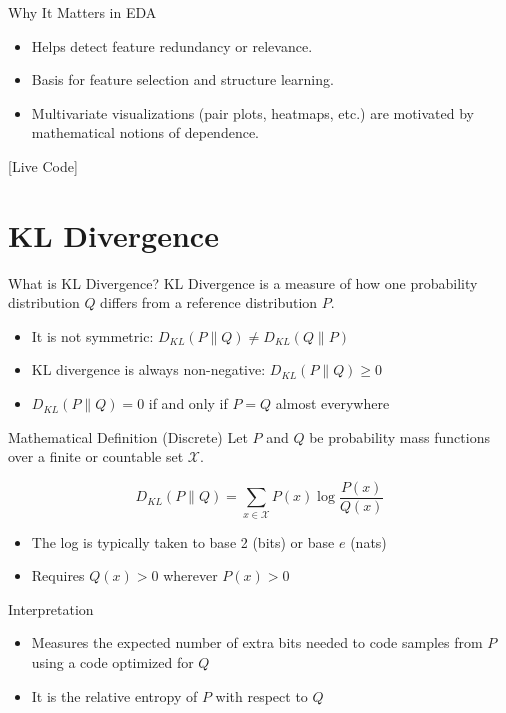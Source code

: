 \documentclass[aspectratio=169]{beamer}
\begin{document}
\begin{frame}[label={sec:org5d05c36}]{Why It Matters in EDA}
\begin{itemize}
\item Helps detect feature redundancy or relevance.
\item Basis for feature selection and structure learning.
\item Multivariate visualizations (pair plots, heatmaps, etc.) are
motivated by mathematical notions of dependence.
\end{itemize}
[Live Code]
\end{frame}
\section{KL Divergence}
\label{sec:org4aa8cb0}
\begin{frame}[label={sec:org71dac23}]{What is KL Divergence?}
KL Divergence is a measure of how one probability distribution \(Q\) differs from a reference distribution \(P\).

\begin{itemize}
\item It is not symmetric: \(D_{KL}(P \parallel Q) \neq D_{KL}(Q \parallel P)\)
\item KL divergence is always non-negative: \(D_{KL}(P \parallel Q) \geq 0\)
\item \(D_{KL}(P \parallel Q) = 0\) if and only if \(P = Q\) almost everywhere
\end{itemize}
\end{frame}

\begin{frame}[label={sec:orgaecf1f5}]{Mathematical Definition (Discrete)}
Let \(P\) and \(Q\) be probability mass functions over a finite or countable set \(\mathcal{X}\).

\begin{equation}
D_{KL}(P \parallel Q) = \sum_{x \in \mathcal{X}} P(x) \log \frac{P(x)}{Q(x)}
\end{equation}

\begin{itemize}
\item The log is typically taken to base 2 (bits) or base \(e\) (nats)
\item Requires \(Q(x) > 0\) wherever \(P(x) > 0\)
\end{itemize}
\end{frame}

\begin{frame}[label={sec:orgb112d85}]{Interpretation}
\begin{itemize}
\item Measures the expected number of \alert{extra bits} needed to code samples
from \(P\) using a code optimized for \(Q\)
\item It is the \alert{relative entropy} of \(P\) with respect to \(Q\)
\end{itemize}
\end{frame}
\end{document}
